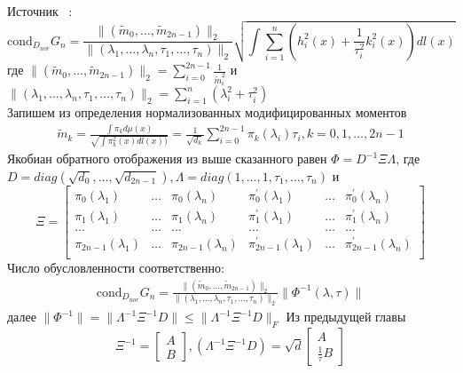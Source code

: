 Источник ~\cite{GautschiW5}:
\begin{equation}
\mbox{cond}_{D_{nor}}G_n=\frac{\parallel (\tilde{m}_0,\ldots,\tilde{m}_{2n-1}) \parallel_2}
{\parallel (\lambda_1,\ldots,\lambda_{n},\tau_{1},\ldots,\tau_{n})\parallel_2}
\sqrt{\int {\sum\limits_{i=1}^{n}\left(
h_i^2(x)+\frac{1}{\tau_i^2}k_i^2(x)
\right)dl(x)}}
\end{equation}
где $\parallel (\tilde{m}_0,\ldots,\tilde{m}_{2n-1}) \parallel_2=
\displaystyle\sum\limits_{i=0}^{2n-1}{\frac{1}{\tilde{m}^2_i}}$ и
$\parallel (\lambda_1,\ldots,\lambda_{n},\tau_{1},\ldots,\tau_{n})\parallel_2=
\sum\limits_{i=1}^{n}{(\lambda_i^2+\tau_i^2)}$ \\
Запишем из определения нормализованных модифицированных моментов
\begin{eqnarray}
\tilde{m}_k=\displaystyle \frac{\int \pi_k d\mu(x)}{\sqrt{\int\pi_k^2(x) dl(x))}}=
\frac{1}{\sqrt{d_k}}\sum\limits_{i=0}^{2n-1}{\pi_k(\lambda_i)\tau_i},k=0,1,\ldots,2n-1 \nonumber
\end{eqnarray}
Якобиан обратного отображения из выше сказанного равен
$\Phi=D^{-1}\Xi\Lambda$, где
$D=diag(\sqrt{d_0},\ldots,\sqrt{d_{2n-1}}),\Lambda=diag(1,\ldots,1,\tau_1,\ldots,\tau_n)$ и
\begin{equation}
\Xi=\left[
\begin{array}{cccccccccc}
\pi_0(\lambda_1) & \ldots & \pi_0(\lambda_n) & \pi^{'}_0(\lambda_1) & \ldots & \pi^{'}_0(\lambda_n) \\
\pi_1(\lambda_1) & \ldots & \pi_1(\lambda_n) & \pi^{'}_1(\lambda_1) & \ldots & \pi^{'}_1(\lambda_n) \\
\ldots & \ldots & \ldots & \ldots & \ldots & \ldots  \\
\pi_{2n-1}(\lambda_1) & \ldots & \pi_{2n-1}(\lambda_n) & \pi^{'}_{2n-1}(\lambda_1) & \ldots & \pi^{'}_{2n-1}(\lambda_n) \\
\end{array}
\right]
\end{equation}
Число обусловленности соответственно:
\begin{eqnarray}
\mbox{cond}_{D_{nor}}G_n=\frac{\parallel (\tilde{m}_0,\ldots,\tilde{m}_{2n-1}) \parallel_2}
{\parallel (\lambda_1,\ldots,\lambda_{n},\tau_{1},\ldots,\tau_{n})\parallel_2}
\parallel\Phi^{-1}(\lambda,\tau) \parallel
\end{eqnarray}
далее $\parallel \Phi^{-1} \parallel=\parallel \Lambda^{-1} \Xi^{-1} D \parallel
\leq \parallel \Lambda^{-1} \Xi^{-1} D \parallel_F$
Из предыдущей главы
\begin{equation}
\Xi^{-1}=\left[
\begin{array}{ccccc}
A \\
B
\end{array}
\right],
(\Lambda^{-1}\Xi^{-1}D)=\sqrt{d}\left[
\begin{array}{cccccccc}
A \\
\displaystyle\frac{1}{\tau}B
\end{array}
\right]
\end{equation}
